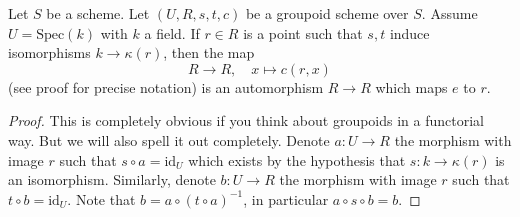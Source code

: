 \begin{lemma}
\label{lemma-groupoid-on-field-move-point}
Let $S$ be a scheme. Let $(U, R, s, t, c)$ be a groupoid scheme
over $S$. Assume $U = \text{Spec}(k)$ with $k$ a field.
If $r \in R$ is a point such that $s, t$ induce
isomorphisms $k \to \kappa(r)$, then the map
$$
R \longrightarrow R, \quad
x \longmapsto c(r, x)
$$
(see proof for precise notation) is an automorphism $R \to R$
which maps $e$ to $r$.
\end{lemma}

\begin{proof}
This is completely obvious if you think about groupoids in a
functorial way. But we will also spell it out completely.
Denote $a : U \to R$ the morphism with image $r$ such that
$s \circ a = \text{id}_U$ which exists by the hypothesis
that $s : k \to \kappa(r)$ is an isomorphism. Similarly, denote
$b : U \to R$ the morphism with image $r$ such that
$t \circ b = \text{id}_U$. Note that
$b = a \circ (t \circ a)^{-1}$, in particular
$a \circ s \circ b = b$.


\end{proof}
